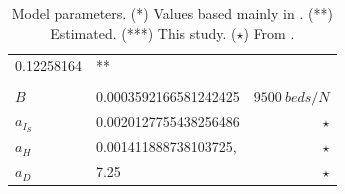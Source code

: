 \begin{table}
\begin{tabular}{@{}llr@{}}
            \num{0.12258164}
            & **
        \\
        \\
            $B$
        &
            \num{0.0003592166581242425}
        &
            $
                \displaystyle
                \SI{9500}{beds} / {N}
            $
        \\
          $a_{I_S}$
            & \num{0.0020127755438256486}
            & $\star$
        \\
          $a_{H}$
            & \num{0.001411888738103725},
            & $\star$
        \\
            $a_D$
            & \num{7.25}
            & $\star$
        \\
        \bottomrule
    \end{tabular}
    \caption{Model parameters. (*) Values based mainly in
    \cite{Zhao2020, Ferguson2020}. (**) Estimated. (***) This study.
    ($\star$) From \cite{Jo2020}.
}
    \label{tbl:parameters_values}
\end{table}